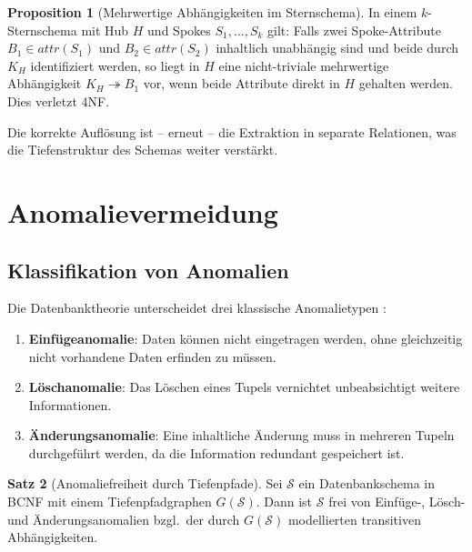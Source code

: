 ﻿\documentclass[12pt,a4paper]{article}
\theoremstyle{definition}
\newtheorem{theorem}{Satz}[section]
\newtheorem{proposition}[theorem]{Proposition}
\theoremstyle{remark}
\newcommand{\att}{\mathit{attr}}
\begin{document}
\begin{proposition}[Mehrwertige Abhängigkeiten im Sternschema]
\label{prop:mvd_stern}
In einem $k$-Sternschema mit Hub $H$ und Spokes $S_1, \ldots, S_k$ gilt:
Falls zwei Spoke-Attribute $B_1 \in \att(S_1)$ und $B_2 \in \att(S_2)$
inhaltlich unabhängig sind und beide durch $K_H$ identifiziert werden, so
liegt in $H$ eine nicht-triviale mehrwertige Abhängigkeit $K_H \twoheadrightarrow B_1$
vor, wenn beide Attribute direkt in $H$ gehalten werden. Dies verletzt 4NF.
\end{proposition}

Die korrekte Auflösung ist -- erneut -- die Extraktion in separate Relationen,
was die Tiefenstruktur des Schemas weiter verstärkt.

\section{Anomalievermeidung}
\label{sec:anomalien}

\subsection{Klassifikation von Anomalien}

Die Datenbanktheorie unterscheidet drei klassische Anomalietypen \cite{Date2003}:

\begin{enumerate}[label=(\roman*)]
  \item \textbf{Einfügeanomalie}: Daten können nicht eingetragen werden,
        ohne gleichzeitig nicht vorhandene Daten erfinden zu müssen.
  \item \textbf{Löschanomalie}: Das Löschen eines Tupels vernichtet
        unbeabsichtigt weitere Informationen.
  \item \textbf{Änderungsanomalie}: Eine inhaltliche Änderung muss in
        mehreren Tupeln durchgeführt werden, da die Information redundant gespeichert ist.
\end{enumerate}

\begin{theorem}[Anomaliefreiheit durch Tiefenpfade]
\label{thm:anomaliefrei}
Sei $\mathcal{S}$ ein Datenbankschema in BCNF mit einem Tiefenpfadgraphen
$G(\mathcal{S})$. Dann ist $\mathcal{S}$ frei von Einfüge-, Lösch- und
Änderungsanomalien bzgl.\ der durch $G(\mathcal{S})$ modellierten
transitiven Abhängigkeiten.
\end{theorem}
\end{document}
